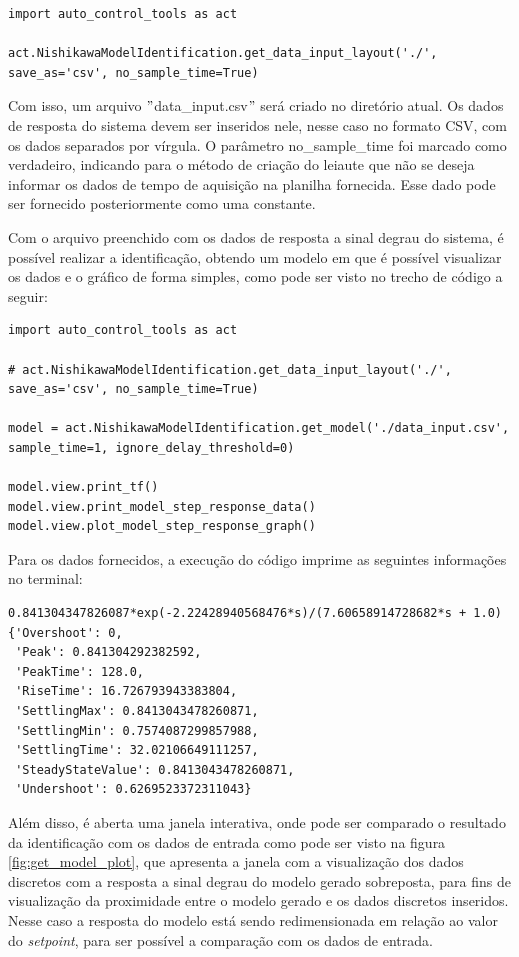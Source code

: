 \begin{lstlisting}[label={lst:get_dil}]
import auto_control_tools as act

act.NishikawaModelIdentification.get_data_input_layout('./', save_as='csv', no_sample_time=True)
\end{lstlisting}

Com isso, um arquivo \("\)data\_input.csv\("\) será criado no diretório atual.
Os dados de resposta do sistema devem ser inseridos nele, nesse caso no formato CSV, com os dados separados por vírgula.
O parâmetro no\_sample\_time foi marcado como verdadeiro, indicando para o método de criação do leiaute que não
se deseja informar os dados de tempo de aquisição na planilha fornecida.
Esse dado pode ser fornecido posteriormente como uma constante.

Com o arquivo preenchido com os dados de resposta a sinal degrau do sistema, é possível realizar a identificação,
obtendo um modelo em que é possível visualizar os dados e o gráfico de forma simples, como pode ser visto no trecho
de código a seguir:

\begin{lstlisting}[label={lst:get_model}]
import auto_control_tools as act

# act.NishikawaModelIdentification.get_data_input_layout('./', save_as='csv', no_sample_time=True)

model = act.NishikawaModelIdentification.get_model('./data_input.csv', sample_time=1, ignore_delay_threshold=0)

model.view.print_tf()
model.view.print_model_step_response_data()
model.view.plot_model_step_response_graph()
\end{lstlisting}

Para os dados fornecidos, a execução do código imprime as seguintes informações no terminal:
\begin{lstlisting}[label={lst:get_model_out}]
0.841304347826087*exp(-2.22428940568476*s)/(7.60658914728682*s + 1.0)
{'Overshoot': 0,
 'Peak': 0.841304292382592,
 'PeakTime': 128.0,
 'RiseTime': 16.726793943383804,
 'SettlingMax': 0.8413043478260871,
 'SettlingMin': 0.7574087299857988,
 'SettlingTime': 32.02106649111257,
 'SteadyStateValue': 0.8413043478260871,
 'Undershoot': 0.6269523372311043}
\end{lstlisting}

Além disso, é aberta uma janela interativa, onde pode ser comparado o resultado da identificação com os dados de entrada
como pode ser visto na figura \ref{fig:get_model_plot}, que apresenta a janela com a visualização dos dados discretos
com a resposta a sinal degrau do modelo gerado sobreposta, para fins de visualização da proximidade entre o modelo
gerado e os dados discretos inseridos.
Nesse caso a resposta do modelo está sendo redimensionada em relação ao valor do \textit{setpoint}, para ser possível a
comparação com os dados de entrada.

